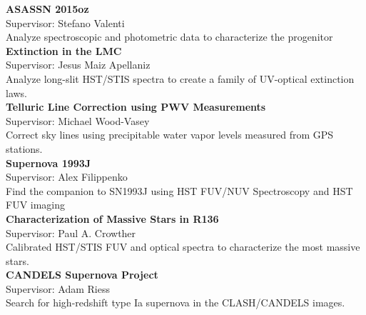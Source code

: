 \documentclass{res}
\begin{document}
\begin{resume}
{\bf ASASSN 2015oz} \hspace{179pt} \\
\hspace*{24pt}Supervisor: Stefano Valenti\\
\hspace*{24pt}Analyze spectroscopic and photometric data to characterize the progenitor\\
{\bf Extinction in the LMC}\hspace{149.95pt} \\
\hspace*{24pt}Supervisor: Jesus Maiz Apellaniz\\
\hspace*{24pt}Analyze long-slit HST/STIS spectra to create a family of UV-optical extinction laws. \\
{\bf Telluric Line Correction using PWV Measurements} \hspace{2pt} \\
\hspace*{24pt}Supervisor: Michael Wood-Vasey\\
\hspace*{24pt}Correct sky lines using precipitable water vapor levels measured from GPS stations. \\
{\bf  Supernova 1993J}\hspace{180pt} \\
\hspace*{24pt}Supervisor: Alex Filippenko \\
\hspace*{24pt}Find the companion to SN1993J using HST FUV/NUV Spectroscopy and HST FUV imaging \\
{\bf  Characterization of Massive Stars in R136 } \hspace{45pt} \\
\hspace*{24pt}Supervisor: Paul A. Crowther\\
\hspace*{24pt}Calibrated HST/STIS FUV and optical spectra to characterize the most massive stars. \\
{\bf CANDELS Supernova Project}\hspace{116pt}\\
\hspace*{24pt}Supervisor: Adam Riess \\
\hspace*{24pt}Search for high-redshift type Ia supernova in the CLASH/CANDELS images.\\

\end{resume}
\end{document}

